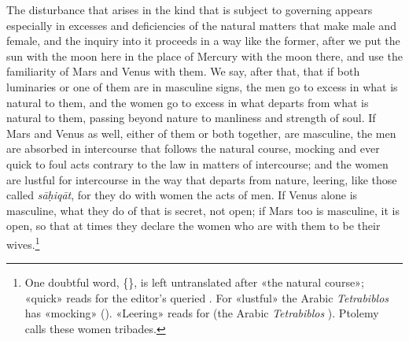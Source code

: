 \documentclass[11pt]{article}
\newcommand{\Fol}[1]{\marginpar{\footnotesize\color{gray}f.\,#1}}
\begin{document}
\par \Fol{62v}The disturbance that arises in the kind that is subject to governing appears especially in excesses and deficiencies of the natural matters that make male and female, and the inquiry into it proceeds in a way like the former, after we put the sun with the moon here in the place of Mercury with the moon there, and use the familiarity of Mars and Venus with them. We say, after that, that if both luminaries or one of them are in masculine signs, the men go to excess in what is natural to them, and the women go to excess in what departs from what is natural to them, passing beyond nature to manliness and strength of soul. If Mars and Venus as well, either of them or both together, are masculine, the men are absorbed in intercourse that follows the natural course, mocking and ever quick to foul acts contrary to the law in matters of intercourse; and the women are lustful for intercourse in the way that departs from nature, leering, like those called \emph{sāḥiqāt}, for they do with women the acts of men. If Venus alone is masculine, what they do of that is secret, not open; if Mars too is masculine, it is open, so that at times they declare the women who are with them to be their wives.\footnote{One doubtful word, \{\}, is left untranslated after «the natural course»; «quick» reads  for the editor's queried . For «lustful» the Arabic \emph{Tetrabiblos} has «mocking» (). «Leering» reads  for  (the Arabic \emph{Tetrabiblos} ). Ptolemy calls these women tribades.}\par
\end{document}

